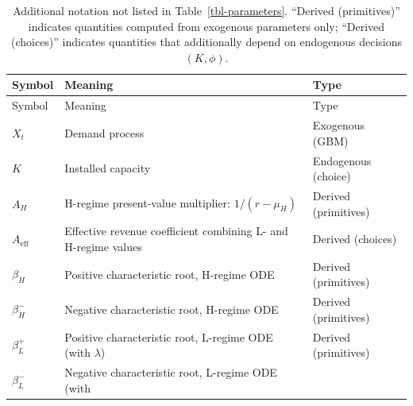 \documentclass[
  11pt,
  letterpaper,
]{scrartcl}
\begin{document}
\begin{longtable}[]{@{}
  >{\centering\arraybackslash}p{}
  >{\raggedright\arraybackslash}p{}
  >{\raggedright\arraybackslash}p{}@{}}
\caption{Additional notation not listed in Table~\ref{tbl-parameters}.
``Derived (primitives)'' indicates quantities computed from exogenous
parameters only; ``Derived (choices)'' indicates quantities that
additionally depend on endogenous decisions
\((K, \phi)\).}\label{tbl-notation}\tabularnewline
\toprule\noalign{}
\begin{minipage}[b]{\linewidth}\centering
Symbol
\end{minipage} & \begin{minipage}[b]{\linewidth}\raggedright
Meaning
\end{minipage} & \begin{minipage}[b]{\linewidth}\raggedright
Type
\end{minipage} \\
\midrule\noalign{}
\endfirsthead
\toprule\noalign{}
\begin{minipage}[b]{\linewidth}\centering
Symbol
\end{minipage} & \begin{minipage}[b]{\linewidth}\raggedright
Meaning
\end{minipage} & \begin{minipage}[b]{\linewidth}\raggedright
Type
\end{minipage} \\
\midrule\noalign{}
\endhead
\bottomrule\noalign{}
\endlastfoot
\(X_t\) & Demand process & Exogenous (GBM) \\
\(K\) & Installed capacity & Endogenous (choice) \\
\(A_H\) & H-regime present-value multiplier: \(1/(r - \mu_H)\) & Derived
(primitives) \\
\(A_{\text{eff}}\) & Effective revenue coefficient combining L- and
H-regime values & Derived (choices) \\
\(\beta_H\) & Positive characteristic root, H-regime ODE & Derived
(primitives) \\
\(\beta_H^-\) & Negative characteristic root, H-regime ODE & Derived
(primitives) \\
\(\beta_L^+\) & Positive characteristic root, L-regime ODE (with
\(\lambda\)) & Derived (primitives) \\
\(\beta_L^-\) & Negative characteristic root, L-regime ODE (with

\end{longtable}
\end{document}
